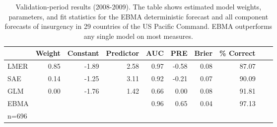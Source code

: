 \documentclass[12pt,fullpage,endnotes]{article}
\begin{document}
\begin{table}[p]
\small
\begin{center}
  \caption{\footnotesize Validation-period results (2008-2009).  The
    table shows estimated model weights, parameters, and fit
    statistics for the EBMA deterministic forecast and all component
    forecasts of insurgency in 29 countries of the US Pacific Command.  EBMA
    outperforms any single model on most measures.}\label{InSam1}
\begin{tabular}{lrrrrrrrrr}
  \toprule
 & Weight & Constant & Predictor & AUC & PRE & Brier & \% Correct \\ 
  \midrule
LMER & 0.85 & -1.89 & 2.58 & 0.97 & -0.58 & 0.08 & 87.07 \\
   SAE & 0.14 & -1.25 & 3.11 & 0.92 & -0.21 & 0.07 & 90.09\\
 GLM & 0.00 & -1.76 & 1.42 & 0.66 & 0.00 & 0.08 & 91.81 \\
  EBMA &  &  &  & 0.96 & 0.65 & 0.04 & 97.13 \\   
\bottomrule
n=696\\
\end{tabular}
\end{center}
\end{table}
\end{document}
